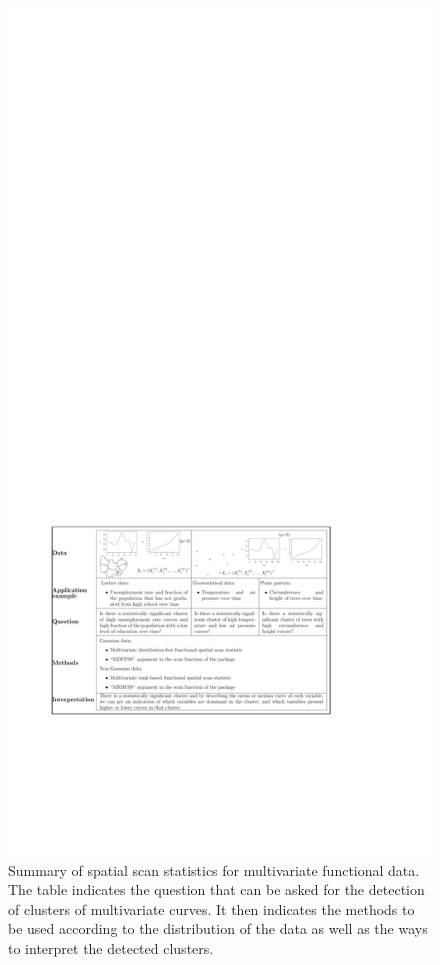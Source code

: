 \begin{figure}[h!]
\centering
\includegraphics[width=\linewidth]{code_RJ_multifonc.pdf}
\caption{Summary of spatial scan statistics for multivariate functional data. The table indicates the question that can be asked for the detection of clusters of multivariate curves. It then indicates the methods to be used according to the distribution of the data as well as the ways to interpret the detected clusters.
}
\end{figure}
